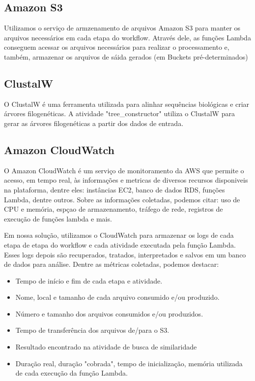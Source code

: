 \subsection{Amazon S3}
Utilizamos o serviço de armzenamento de arquivos Amazon S3 para manter os arquivos necessários em cada etapa do workflow. Através dele, as funções Lambda conseguem acessar os arquivos necessários para realizar o processamento e, também, armazenar os arquivos de sáida gerados (em Buckets pré-determinados)


\subsection{ClustalW}
O ClustalW é uma ferramenta utilizada para alinhar sequências biológicas e criar árvores filogenéticas. A atividade "tree\_constructor" utiliza o ClustalW para gerar as árvores filogenéticas a partir dos dados de entrada.


\subsection{Amazon CloudWatch}
O Amazon CloudWatch é um serviço de monitoramento da AWS que permite o acesso, em tempo real, às informações e metricas de diversos recursos disponiveis na plataforma, dentre eles: instâncias EC2, banco de dados RDS, funções Lambda, dentre outros. Sobre as informações coletadas, podemos citar: uso de CPU e memória, espçao de armazenamento, tráfego de rede, registros de execução de funções lambda e mais.

Em nossa solução, utilizamos o CloudWatch para armazenar os logs de cada etapa de etapa do workflow e cada atividade executada pela função Lambda. Esses logs depois são recuperados, tratados, interpretados e salvos em um banco de dados para análise. Dentre as métricas coletadas, podemos destacar:

\begin{itemize}
\item Tempo de início e fim de cada etapa e atividade.
\item Nome, local e tamanho de cada arquivo consumido e/ou produzido.
\item Número e tamanho dos arquivos consumidos e/ou produzidos.
\item Tempo de transferência dos arquivos de/para o S3.
\item Resultado encontrado na atividade de busca de similaridade
\item Duração real, duração "cobrada", tempo de inicialização, memória utilizada de cada execução da função Lambda.
\end{itemize}


